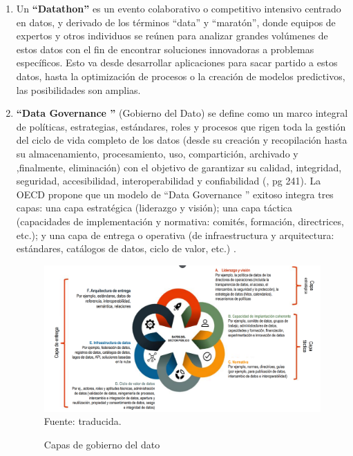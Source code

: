 \begin{enumerate}
	\item Un \textbf{``Datathon''} \label{def7} \citep{Datathon2016Anslow} es un evento colaborativo o competitivo intensivo centrado en datos, y derivado de los términos ``data'' y ``maratón'', donde equipos de expertos y otros individuos se reúnen para analizar grandes volúmenes de estos datos con el fin de encontrar soluciones innovadoras a problemas específicos. Esto va desde desarrollar aplicaciones para sacar partido a estos datos, hasta la optimización de procesos o la creación de modelos predictivos, las posibilidades son amplias. \\
	
	\item \textbf{``Data Governance ''} \label{def10} (Gobierno del Dato) se define como un marco integral de políticas, estrategias, estándares, roles y procesos que rigen toda la gestión del ciclo de vida completo de los datos (desde su creación y recopilación hasta su almacenamiento, procesamiento, uso, compartición, archivado y ,finalmente, eliminación) con el objetivo de garantizar su calidad, integridad, seguridad, accesibilidad, interoperabilidad y confiabilidad (\cite{HerreraCapriz2024}, pg 241). La OECD propone que un modelo de ``Data Governance '' exitoso integra tres capas: una capa estratégica (liderazgo y visión); una capa táctica (capacidades de implementación y normativa: comités, formación, directrices, etc.); y una capa de entrega o operativa (de infraestructura y arquitectura: estándares, catálogos de datos, ciclo de valor, etc.) \citep{OECD2019}.
			
	\begin{figure}[h]
		\begin{center}
			\caption{Capas de gobierno del dato}
			\includegraphics[scale=0.3]{Imagenes/Bitmap/data_gobernance.png} 
			\footnotesize{Fuente: \citep{OECD2019} traducida.}
		\end{center}
	\end{figure}
	

\end{enumerate}
